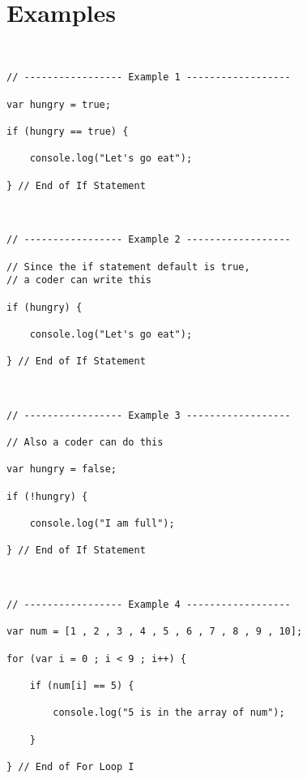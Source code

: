 \documentclass[12pt, letterpaper]{article}
\begin{document}
\section*{Examples}

\begin{lstlisting}


// ----------------- Example 1 ------------------

var hungry = true;

if (hungry == true) {

	console.log("Let's go eat");

} // End of If Statement



// ----------------- Example 2 ------------------

// Since the if statement default is true,
// a coder can write this

if (hungry) {

	console.log("Let's go eat");

} // End of If Statement



// ----------------- Example 3 ------------------

// Also a coder can do this

var hungry = false;

if (!hungry) {

	console.log("I am full");

} // End of If Statement



// ----------------- Example 4 ------------------

var num = [1 , 2 , 3 , 4 , 5 , 6 , 7 , 8 , 9 , 10];

for (var i = 0 ; i < 9 ; i++) {

	if (num[i] == 5) {

		console.log("5 is in the array of num");
	
	}

} // End of For Loop I

\end{lstlisting}
\end{document}
